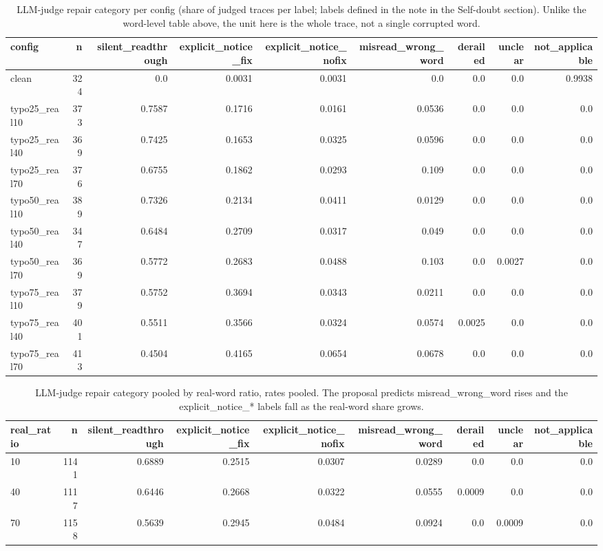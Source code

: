 \documentclass[11pt]{article}
\begin{document}
\begin{table}[H]
\centering
\caption{LLM-judge repair category per config (share of judged traces per label; labels defined in the note in the Self-doubt section). Unlike the word-level table above, the unit here is the whole trace, not a single corrupted word.}
\small
\begin{adjustbox}{max width=\textwidth}
\begin{tabular}{lrrrrrrrr}
\toprule
\textbf{config} & \textbf{n} & \textbf{silent\_readthrough} & \textbf{explicit\_notice\_fix} & \textbf{explicit\_notice\_nofix} & \textbf{misread\_wrong\_word} & \textbf{derailed} & \textbf{unclear} & \textbf{not\_applicable} \\
\midrule
clean & 324 & 0.0 & 0.0031 & 0.0031 & 0.0 & 0.0 & 0.0 & 0.9938 \\
typo25\_real10 & 373 & 0.7587 & 0.1716 & 0.0161 & 0.0536 & 0.0 & 0.0 & 0.0 \\
typo25\_real40 & 369 & 0.7425 & 0.1653 & 0.0325 & 0.0596 & 0.0 & 0.0 & 0.0 \\
typo25\_real70 & 376 & 0.6755 & 0.1862 & 0.0293 & 0.109 & 0.0 & 0.0 & 0.0 \\
typo50\_real10 & 389 & 0.7326 & 0.2134 & 0.0411 & 0.0129 & 0.0 & 0.0 & 0.0 \\
typo50\_real40 & 347 & 0.6484 & 0.2709 & 0.0317 & 0.049 & 0.0 & 0.0 & 0.0 \\
typo50\_real70 & 369 & 0.5772 & 0.2683 & 0.0488 & 0.103 & 0.0 & 0.0027 & 0.0 \\
typo75\_real10 & 379 & 0.5752 & 0.3694 & 0.0343 & 0.0211 & 0.0 & 0.0 & 0.0 \\
typo75\_real40 & 401 & 0.5511 & 0.3566 & 0.0324 & 0.0574 & 0.0025 & 0.0 & 0.0 \\
typo75\_real70 & 413 & 0.4504 & 0.4165 & 0.0654 & 0.0678 & 0.0 & 0.0 & 0.0 \\
\bottomrule
\end{tabular}
\end{adjustbox}
\end{table}

\begin{table}[H]
\centering
\caption{LLM-judge repair category pooled by real-word ratio, rates pooled. The proposal predicts misread\_wrong\_word rises and the explicit\_notice\_* labels fall as the real-word share grows.}
\small
\begin{adjustbox}{max width=\textwidth}
\begin{tabular}{lrrrrrrrr}
\toprule
\textbf{real\_ratio} & \textbf{n} & \textbf{silent\_readthrough} & \textbf{explicit\_notice\_fix} & \textbf{explicit\_notice\_nofix} & \textbf{misread\_wrong\_word} & \textbf{derailed} & \textbf{unclear} & \textbf{not\_applicable} \\
\midrule
10 & 1141 & 0.6889 & 0.2515 & 0.0307 & 0.0289 & 0.0 & 0.0 & 0.0 \\
40 & 1117 & 0.6446 & 0.2668 & 0.0322 & 0.0555 & 0.0009 & 0.0 & 0.0 \\
70 & 1158 & 0.5639 & 0.2945 & 0.0484 & 0.0924 & 0.0 & 0.0009 & 0.0 \\
\bottomrule
\end{tabular}
\end{adjustbox}
\end{table}
\end{document}
